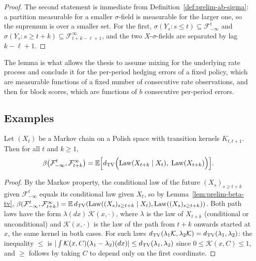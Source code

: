 \documentclass[../../../main.tex]{subfiles}
\begin{document}
\begin{proof}
The second statement is immediate from Definition~\ref{def:prelim-ab-sigma}: a partition measurable for a smaller $\sigma$-field is measurable for the larger one, so the supremum is over a smaller set. For the first, $\sigma(Y_s:s\le t)\subseteq\mathcal F_{-\infty}^{t}$ and $\sigma(Y_s:s\ge t+k)\subseteq\mathcal F_{t+k-\ell+1}^{\infty}$, and the two $X$-$\sigma$-fields are separated by lag $k-\ell+1$.
\end{proof}

The lemma is what allows the thesis to assume mixing for the underlying rate process and conclude it for the per-period hedging errors of a fixed policy, which are measurable functions of a fixed number of consecutive rate observations, and then for block scores, which are functions of $b$ consecutive per-period errors.

\subsection{Examples}

\begin{lemma}\label{lem:prelim-markov}
Let $(X_t)$ be a Markov chain on a Polish space with transition kernels $K_{t,t+1}$. Then for all $t$ and $k\ge1$,
\[
\beta\big(\mathcal F_{-\infty}^{t},\mathcal F_{t+k}^{\infty}\big)=\mathbb{E}\Big[d_{\mathrm{TV}}\Big(\mathrm{Law}(X_{t+k}\mid X_t),\;\mathrm{Law}(X_{t+k})\Big)\Big].
\]
\end{lemma}

\begin{proof}
By the Markov property, the conditional law of the future $(X_s)_{s\ge t+k}$ given $\mathcal F_{-\infty}^{t}$ equals its conditional law given $X_t$, so by Lemma~\ref{lem:prelim-beta-tv}, $\beta(\mathcal F_{-\infty}^{t},\mathcal F_{t+k}^{\infty})=\mathbb{E}\,d_{\mathrm{TV}}(\mathrm{Law}((X_s)_{s\ge t+k}\mid X_t),\mathrm{Law}((X_s)_{s\ge t+k}))$. Both path laws have the form $\lambda(dx)\,\mathcal K(x,\cdot)$, where $\lambda$ is the law of $X_{t+k}$ (conditional or unconditional) and $\mathcal K(x,\cdot)$ is the law of the path from $t+k$ onwards started at $x$, the same kernel in both cases. For such laws $d_{\mathrm{TV}}(\lambda_1\mathcal K,\lambda_2\mathcal K)=d_{\mathrm{TV}}(\lambda_1,\lambda_2)$: the inequality $\le$ is $|\int\mathcal K(x,C)(\lambda_1-\lambda_2)(dx)|\le d_{\mathrm{TV}}(\lambda_1,\lambda_2)$ since $0\le\mathcal K(x,C)\le1$, and $\ge$ follows by taking $C$ to depend only on the first coordinate.
\end{proof}
\end{document}
